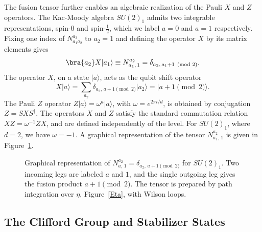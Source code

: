 \documentclass[12pt,a4paper]{article}
\def\ket#1{{|{#1}\rangle}}
\begin{document}
The fusion tensor further enables an algebraic realization of the Pauli $X$ and $Z$ operators. The Kac-Moody algebra $SU(2)_1$ admits two integrable representations, spin-$0$ and spin-$\frac{1}{2}$, which we label $a=0$ and $a=1$ respectively. Fixing one index of $N^{a_3}_{a_1 a_2}$ to $a_2 = 1$ and defining the operator $X$ by its matrix elements gives
%
\begin{equation}\label{XMatrixElements}
\bra{a_2} X \ket{a_1} \equiv N^{a_2}_{a_1,\, 1} = \delta_{a_2,\, a_1 + 1 \pmod{2}}.
\end{equation}
%
The operator $X$, on a state $\ket{a}$, acts as the qubit shift operator
%
\begin{equation}\label{ShiftFromFusion}
X\ket{a} = \sum_{a_2} \delta_{a_2,\, a + 1 \pmod{2}} \ket{a_2} = \ket{a + 1 \pmod{2}}.
\end{equation}
%
The Pauli $Z$ operator $Z\ket{a} = \omega^a \ket{a}$, with $\omega = e^{2\pi i/d}$, is obtained by conjugation $Z = SXS^\dagger$. The operators $X$ and $Z$ satisfy the standard commutation relation $XZ = \omega^{-1}ZX$, and are defined independently of the level. For $SU(2)_1$, where $d = 2$, we have $\omega = -1$. A graphical representation of the tensor $N^{a_2}_{a_1,\, 1}$ is given in Figure~\ref{TensorGraph}.
%
\begin{figure}[h]
\begin{center}
\caption{Graphical representation of $N_{a,\,1}^{a_2} = \delta_{a_2,\, a+1\pmod{2}}$ for $SU(2)_1$. Two incoming legs are labeled $a$ and $1$, and the single outgoing leg gives the fusion product $a+1 \pmod{2}$. The tensor is prepared by path integration over $\eta$, Figure~\ref{Eta}, with Wilson loops.}
\label{TensorGraph}
\end{center}
\end{figure}
%

\subsection{The Clifford Group and Stabilizer States}\label{StabilizerTopology}
\end{document}
